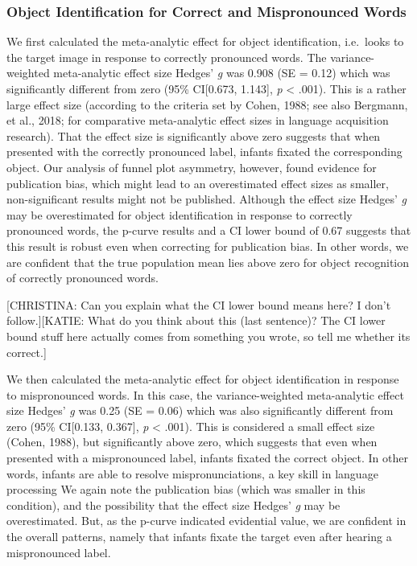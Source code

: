 \documentclass[man]{apa6}
\theoremstyle{definition}
\theoremstyle{definition}
\theoremstyle{definition}
\theoremstyle{remark}
\begin{document}
\subsubsection{Object Identification for Correct and Mispronounced
Words}\label{object-identification-for-correct-and-mispronounced-words}

We first calculated the meta-analytic effect for object identification,
i.e.~looks to the target image in response to correctly pronounced
words. The variance-weighted meta-analytic effect size Hedges' \emph{g}
was 0.908 (SE = 0.12) which was significantly different from zero (95\%
CI{[}0.673, 1.143{]}, \emph{p} \textless{} .001). This is a rather large
effect size (according to the criteria set by Cohen, 1988; see also
Bergmann, et al., 2018; for comparative meta-analytic effect sizes in
language acquisition research). That the effect size is significantly
above zero suggests that when presented with the correctly pronounced
label, infants fixated the corresponding object. Our analysis of funnel
plot asymmetry, however, found evidence for publication bias, which
might lead to an overestimated effect sizes as smaller, non-significant
results might not be published. Although the effect size Hedges'
\emph{g} may be overestimated for object identification in response to
correctly pronounced words, the p-curve results and a CI lower bound of
0.67 suggests that this result is robust even when correcting for
publication bias. In other words, we are confident that the true
population mean lies above zero for object recognition of correctly
pronounced words.

{[}CHRISTINA: Can you explain what the CI lower bound means here? I
don't follow.{]}{[}KATIE: What do you think about this (last sentence)?
The CI lower bound stuff here actually comes from something you wrote,
so tell me whether its correct.{]}

We then calculated the meta-analytic effect for object identification in
response to mispronounced words. In this case, the variance-weighted
meta-analytic effect size Hedges' \emph{g} was 0.25 (SE = 0.06) which
was also significantly different from zero (95\% CI{[}0.133, 0.367{]},
\emph{p} \textless{} .001). This is considered a small effect size
(Cohen, 1988), but significantly above zero, which suggests that even
when presented with a mispronounced label, infants fixated the correct
object. In other words, infants are able to resolve mispronunciations, a
key skill in language processing We again note the publication bias
(which was smaller in this condition), and the possibility that the
effect size Hedges' \emph{g} may be overestimated. But, as the p-curve
indicated evidential value, we are confident in the overall patterns,
namely that infants fixate the target even after hearing a mispronounced
label.
\end{document}
